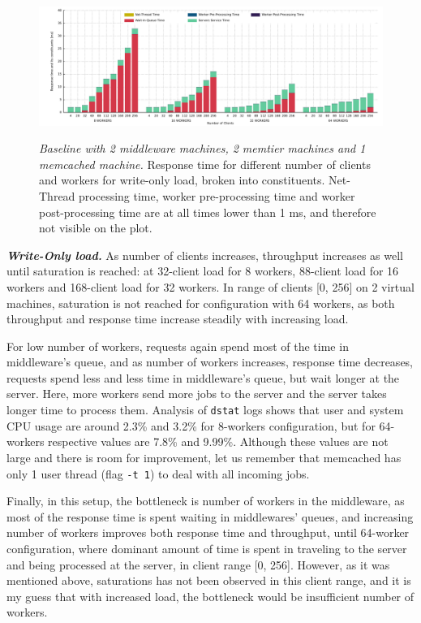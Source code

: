 \documentclass[11pt,a4paper]{article}
\begin{document}
\begin{figure}[ht!]
	\centering	
	\includegraphics[width=1\linewidth]{../plots/baseline_2midd_2vms/timers/ALL_TIMES_TOGETHER_WRITE-ONLY.pdf}
	\label{Figure:baseline_2midd_2vms_all:a}\\
	\caption{\textit{Baseline with 2 middleware machines, 2 memtier machines and 1 memcached machine.} Response time for different number of clients and workers for write-only load, broken into constituents. Net-Thread processing time, worker pre-processing time and worker post-processing time are at all times lower than 1 ms, and therefore not visible on the plot.}
	\label{Figure:baseline_2midd_2vms_all}	
\end{figure}

\textit{\textbf{Write-Only load.}} As number of clients increases, throughput increases as well until saturation is reached: at 32-client load for 8 workers, 88-client load for 16 workers and 168-client load for 32 workers. In range of clients [0, 256] on 2 virtual machines, saturation is not reached for configuration with 64 workers, as both throughput and response time increase steadily with increasing load.

For low number of workers, requests again spend most of the time in middleware's queue, and as number of workers increases, response time decreases, requests spend less and less time in middleware's queue, but wait longer at the server. Here, more workers send more jobs to the server and the server takes longer time to process them. Analysis of \texttt{dstat} logs shows that user and system CPU usage are around 2.3\% and 3.2\% for 8-workers configuration, but for 64-workers respective values are 7.8\% and 9.99\%. Although these values are not large and there is room for improvement, let us remember that memcached has only 1 user thread (flag \texttt{-t 1}) to deal with all incoming jobs.

Finally, in this setup, the bottleneck is number of workers in the middleware, as most of the response time is spent waiting in middlewares' queues, and increasing number of workers improves both response time and throughput, until 64-worker configuration, where dominant amount of time is spent in traveling to the server and being processed at the server, in client range [0, 256]. However, as it was mentioned above, saturations has not been observed in this client range, and it is my guess that with increased load, the bottleneck would be insufficient number of workers.
\end{document}

